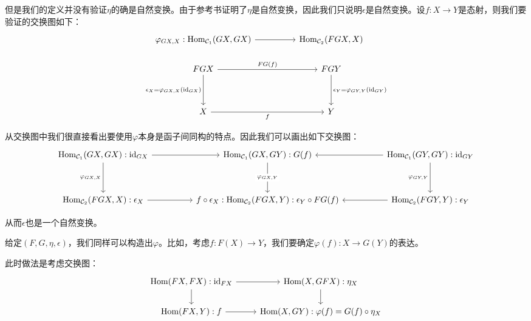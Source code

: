     但是我们的定义并没有验证$\eta$的确是自然变换。由于参考书证明了$\eta$是自然变换，因此我们只说明$\epsilon$是自然变换。设$f:X \to Y$是态射，则我们要验证的交换图如下：
    \[
        \centering
        \begin{tikzcd}
            {\varphi_{GX,X}:\mathrm{Hom}_{\mathcal{C}_1}(GX,GX)} && {\mathrm{Hom}_{\mathcal{C}_2}(FGX,X)} \\
            FGX && FGY \\
            \\
            X && Y
            \arrow["{\epsilon_X=\varphi_{GX,X}(\mathrm{id}_{GX})}"', from=2-1, to=4-1]
            \arrow["{\epsilon_Y=\varphi_{GY,Y}(\mathrm{id}_{GY})}", from=2-3, to=4-3]
            \arrow["{FG(f)}", from=2-1, to=2-3]
            \arrow["f"', from=4-1, to=4-3]
            \arrow[from=1-1, to=1-3]
        \end{tikzcd}
    \]
    
    从交换图中我们很直接看出要使用$\varphi$本身是函子间同构的特点。因此我们可以画出如下交换图：
    \[
        \centering
        \begin{tikzcd}
            {\mathrm{Hom}_{\mathcal{C}_1}(GX,GX):\mathrm{id}_{GX}} && {\mathrm{Hom}_{\mathcal{C}_1}(GX,GY):G(f)} && {\mathrm{Hom}_{\mathcal{C}_1}(GY,GY):\mathrm{id}_{GY}} \\
            \\
            {\mathrm{Hom}_{\mathcal{C}_2}(FGX,X):\epsilon_X} && {f\circ \epsilon_X:\mathrm{Hom}_{\mathcal{C}_2}(FGX,Y):\epsilon_Y\circ FG(f)} && {\mathrm{Hom}_{\mathcal{C}_2}(FGY,Y):\epsilon_Y}
            \arrow[from=1-1, to=1-3]
            \arrow["{\varphi_{GX,X}}"', from=1-1, to=3-1]
            \arrow["{\varphi_{GX,Y}}"{description}, from=1-3, to=3-3]
            \arrow[from=3-1, to=3-3]
            \arrow[from=3-5, to=3-3]
            \arrow[from=1-5, to=1-3]
            \arrow["{\varphi_{GY,Y}}"', from=1-5, to=3-5]
        \end{tikzcd}
    \]

    从而$\epsilon$也是一个自然变换。

    给定$(F,G,\eta,\epsilon)$，我们同样可以构造出$\varphi$。比如，考虑$f:F(X) \to Y$，我们要确定$\varphi(f):X \to G(Y)$的表达。

    此时做法是考虑交换图：
    \[
        \centering
        \begin{tikzcd}
            {\mathrm{Hom}(FX,FX):\mathrm{id}_{FX}} & {\mathrm{Hom}(X,GFX):\eta_X} \\
            {\mathrm{Hom}(FX,Y):f} & {\mathrm{
                Hom}(X,GY):\varphi(f)=G(f)\circ\eta_X}
            \arrow[from=1-1, to=1-2]
            \arrow[from=1-1, to=2-1]
            \arrow[from=1-2, to=2-2]
            \arrow[from=2-1, to=2-2]
        \end{tikzcd}
    \]

